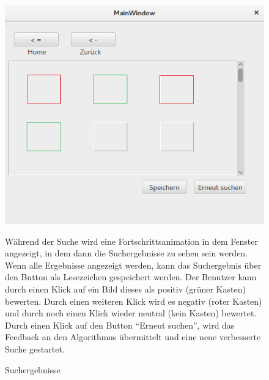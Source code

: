 \begin{figure}
\includegraphics[width=1\linewidth]{img/Suchergebnisse}
\caption{Suchergebnisse}
\label{fig:suchergebnisse}
\vspace{10pt}
Während der Suche wird eine Fortschrittsanimation in dem Fenster angezeigt, in dem dann die Suchergebnisse zu sehen sein werden. Wenn alle Ergebnisse angezeigt werden, kann das Suchergebnis über den Button als Lesezeichen gespeichert werden.\newline 
Der Benutzer kann durch einen Klick auf ein Bild dieses als positiv (grüner Kasten) bewerten. Durch einen weiteren Klick wird es negativ (roter Kasten) und durch noch einen Klick wieder neutral (kein Kasten) bewertet. Durch einen Klick auf den Button \enquote{Erneut suchen}, wird das Feedback an den Algorithmus übermittelt und eine neue verbesserte Suche gestartet.
\end{figure}
\pagebreak

